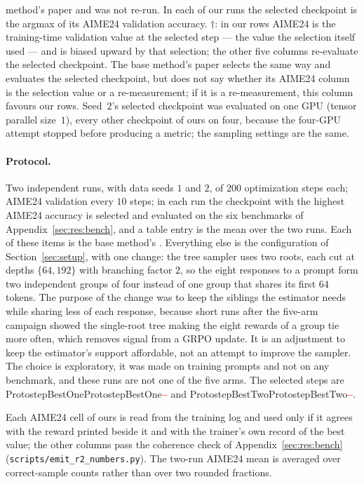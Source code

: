 \documentclass[11pt]{article}
\providecommand{\PENDING}{\textcolor{red}{\textbf{--}}}
\newcommand{\num}[1]{\ifcsname #1\endcsname\csname #1\endcsname\else\PENDING\fi}
\begin{document}
\begin{table}[t]
{method's paper and was not re-run. In each of our runs the selected checkpoint is
the argmax of its AIME24 validation accuracy. $\dagger$: in our rows AIME24 is the
training-time validation value at the selected step --- the value the selection
itself used --- and is biased upward by that selection; the other five columns
re-evaluate the selected checkpoint. The base method's paper selects the same way
and evaluates the selected checkpoint, but does not say whether its AIME24 column is
the selection value or a re-measurement; if it is a re-measurement, this column
favours our rows. Seed~$2$'s selected checkpoint was evaluated on one GPU (tensor
parallel size~$1$), every other checkpoint of ours on four, because the four-GPU
attempt stopped before producing a metric; the sampling settings are the same.}
\label{tab:reported}
\end{table}

\paragraph{Protocol.} Two independent runs, with data seeds $1$ and $2$, of $200$
optimization steps each; AIME24 validation every $10$ steps; in each run the
checkpoint with the highest AIME24 accuracy is selected and evaluated on the six
benchmarks of Appendix~\ref{sec:res:bench}, and a table entry is the mean over the two
runs. Each of these items is the base method's \citep[App.~E]{steer}. Everything else
is the configuration of Section~\ref{sec:setup}, with one change: the tree sampler
uses two roots, each cut at depths $\{64, 192\}$ with branching factor $2$, so the
eight responses to a prompt form two independent groups of four instead of one group
that shares its first $64$ tokens. The purpose of the change was to keep the
siblings the estimator needs while sharing less of each response, because short runs
after the five-arm campaign showed the single-root tree making the eight rewards of a
group tie more often, which removes signal from a GRPO update. It is an adjustment to
keep the estimator's support affordable, not an attempt to improve the sampler. The
choice is exploratory, it was made on training prompts and not on any benchmark, and
these runs are not one of the five arms. The selected
steps are \num{ProtostepBestOne} and \num{ProtostepBestTwo}.


Each AIME24 cell of ours is read from the training log and used only if it agrees
with the reward printed beside it and with the trainer's own record of the best
value; the other columns pass the coherence check of Appendix~\ref{sec:res:bench}
(\texttt{scripts/emit\_r2\_numbers.py}). The two-run AIME24 mean is averaged over
correct-sample counts rather than over two rounded fractions.
\end{document}
